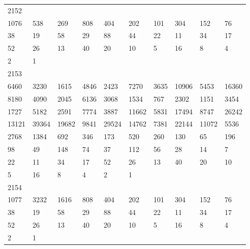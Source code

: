 \begin{longtable}{*{10}{l}}
2152&&&&&&&&&\\
1076& 538& 269& 808& 404& 202& 101& 304& 152& 76\\
38& 19& 58& 29& 88& 44& 22& 11& 34& 17\\
52& 26& 13& 40& 20& 10& 5& 16& 8& 4\\
2& 1& \\

2153&&&&&&&&&\\
6460& 3230& 1615& 4846& 2423& 7270& 3635& 10906& 5453& 16360\\
8180& 4090& 2045& 6136& 3068& 1534& 767& 2302& 1151& 3454\\
1727& 5182& 2591& 7774& 3887& 11662& 5831& 17494& 8747& 26242\\
13121& 39364& 19682& 9841& 29524& 14762& 7381& 22144& 11072& 5536\\
2768& 1384& 692& 346& 173& 520& 260& 130& 65& 196\\
98& 49& 148& 74& 37& 112& 56& 28& 14& 7\\
22& 11& 34& 17& 52& 26& 13& 40& 20& 10\\
5& 16& 8& 4& 2& 1& \\

2154&&&&&&&&&\\
1077& 3232& 1616& 808& 404& 202& 101& 304& 152& 76\\
38& 19& 58& 29& 88& 44& 22& 11& 34& 17\\
52& 26& 13& 40& 20& 10& 5& 16& 8& 4\\
2& 1& \\


\end{longtable}
